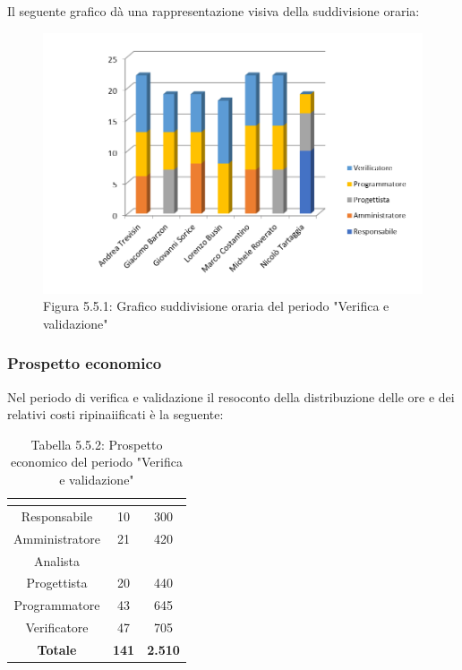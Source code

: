 Il seguente grafico dà una rappresentazione visiva della suddivisione oraria: \\
\begin{figure} [H]
	\centering
	\includegraphics[scale=1]{Res/ExcelGrafici/Grafici/RipianificazioneOre.png}
	\caption{Figura 5.5.1: Grafico suddivisione oraria del periodo "Verifica e validazione"}\label{}
\end{figure}


\subsubsection{Prospetto economico}
Nel periodo di verifica e validazione il resoconto della distribuzione delle ore e dei relativi costi ripinaiificati è la seguente:

\renewcommand{\arraystretch}{1.5}
\begin{table}[H]
\begin{center}
\begin{tabular}{|c|c|c|}
\hline
\rowcolor{title_row}
\textbf{\color{title_text}{Ruolo}}  & \textbf{\color{title_text}{Ore}} & \textbf{\color{title_text}{Costo in \euro}} \\ \hline
Responsabile    & 10 & 300 \\ \hline
Amministratore  & 21 & 420 \\ \hline
Analista        & & \\ \hline
Progettista     & 20 & 440 \\ \hline
Programmatore   & 43 & 645 \\ \hline
Verificatore    & 47 & 705 \\ \hline
\textbf{Totale} & \textbf{141}    & \textbf{2.510}           \\ \hline
\end{tabular}
\caption{Tabella 5.5.2: Prospetto economico del periodo "Verifica e validazione"\label{}}
\end{center}
\end{table}
\renewcommand{\arraystretch}{1}

